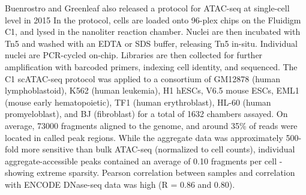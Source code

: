 Buenrostro and Greenleaf also released a protocol for ATAC-seq at single-cell level in 2015 In the protocol, cells are loaded onto 96-plex chips on the Fluidigm C1, and lysed in the nanoliter reaction chamber. Nuclei are then incubated with Tn5 and washed with an EDTA or SDS buffer, releasing Tn5 in-situ. Individual nuclei are PCR-cycled on-chip. Libraries are then collected for further amplification with barcoded primers, indexing cell identity, and sequenced. The C1 scATAC-seq protocol was applied to a consortium of GM12878 (human lymphoblastoid), K562 (human leukemia), H1 hESCs, V6.5 mouse ESCs, EML1 (mouse early hematopoietic), TF1 (human erythroblast), HL-60 (human promyeloblast), and BJ (fibroblast) for a total of \num{1632} chambers assayed. On average, \num{73000} fragments aligned to the genome, and around 35\% of reads were located in called peak regions. While the aggregate data was approximately 500-fold more sensitive than bulk ATAC-seq (normalized to cell counts), individual aggregate-accessible peaks contained an average of 0.10 fragments per cell - showing extreme sparsity. Pearson correlation between samples and correlation with ENCODE DNase-seq data was high (R = 0.86 and 0.80).

